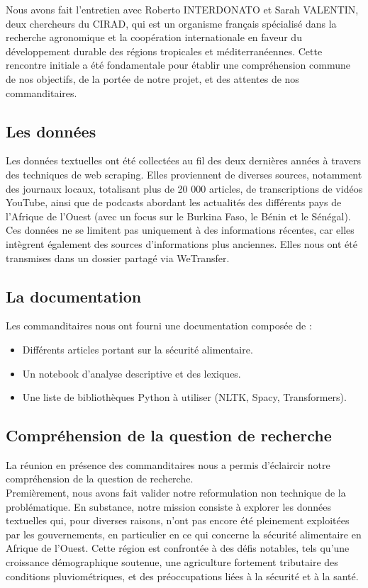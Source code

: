\documentclass{article}
\begin{document}
Nous avons fait l'entretien avec Roberto INTERDONATO et Sarah VALENTIN, deux chercheurs du CIRAD, qui est un organisme français spécialisé dans la recherche agronomique et la coopération internationale en faveur du développement durable des régions tropicales et méditerranéennes. Cette rencontre initiale a été fondamentale pour établir une compréhension commune de nos objectifs, de la portée de notre projet, et des attentes de nos commanditaires.

\subsection{Les données}
Les données textuelles ont été collectées au fil des deux dernières années à travers des techniques de web scraping. Elles proviennent de diverses sources, notamment des journaux locaux, totalisant plus de 20 000 articles, de transcriptions de vidéos YouTube, ainsi que de podcasts abordant les actualités des différents pays de l'Afrique de l'Ouest (avec un focus sur le Burkina Faso, le Bénin et le Sénégal). Ces données ne se limitent pas uniquement à des informations récentes, car elles intègrent également des sources d'informations plus anciennes. Elles nous ont été transmises dans un dossier partagé via WeTransfer.

\subsection{La documentation}
Les commanditaires nous ont fourni une documentation composée de :
\begin{itemize}
    \item Différents articles portant sur la sécurité alimentaire.
    \item Un notebook d'analyse descriptive et des lexiques.
    \item Une liste de bibliothèques Python à utiliser (NLTK, Spacy, Transformers).
\end{itemize}

\subsection{Compréhension de la question de recherche}
La réunion en présence des commanditaires nous a permis d'éclaircir notre compréhension de la question de recherche.\\

Premièrement, nous avons fait valider notre reformulation non technique de la problématique. En substance, notre mission consiste à explorer les données textuelles qui, pour diverses raisons, n'ont pas encore été pleinement exploitées par les gouvernements, en particulier en ce qui concerne la sécurité alimentaire en Afrique de l'Ouest. Cette région est confrontée à des défis notables, tels qu'une croissance démographique soutenue, une agriculture fortement tributaire des conditions pluviométriques, et des préoccupations liées à la sécurité et à la santé.
\end{document}
